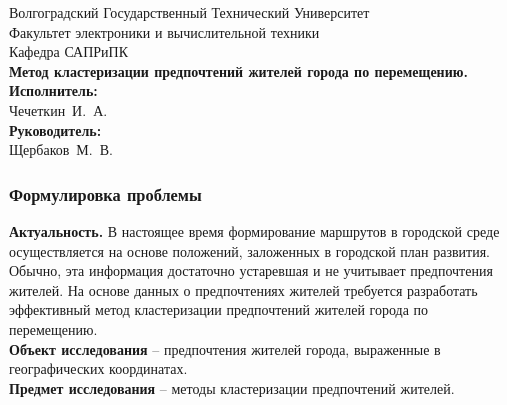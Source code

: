 \begin{frame}
    \begin{center}
        \small
        Волгоградский Государственный Технический Университет \\
        Факультет электроники и вычислительной техники \\
        Кафедра САПРиПК \\
        \vspace{1.5cm}
        \normalsize
        \textbf{Метод кластеризации предпочтений жителей города по
        перемещению.}\\
        \vspace{1.0cm}
        \raggedleft\small
        \textbf{Исполнитель:}\\Чечеткин~И.~А.\\
        \textbf{Руководитель:}\\Щербаков~М.~В.\\
        \vspace{1.5cm}
        \vspace{\fill}
         \the\year
    \end{center}
\end{frame}

\begin{frame}
    \frametitle{Формулировка проблемы}
    \textbf{Актуальность.} В настоящее время формирование маршрутов в городской
    среде осуществляется на основе положений, заложенных в городской план
    развития. Обычно, эта информация достаточно устаревшая и не учитывает
    предпочтения жителей. На основе данных о предпочтениях жителей требуется
    разработать эффективный метод кластеризации предпочтений жителей города
    по перемещению.\\
    \textbf{Объект исследования} -- предпочтения жителей города, выраженные
      в географических координатах.\\
    \textbf{Предмет исследования} -- методы кластеризации предпочтений жителей.
\end{frame}

